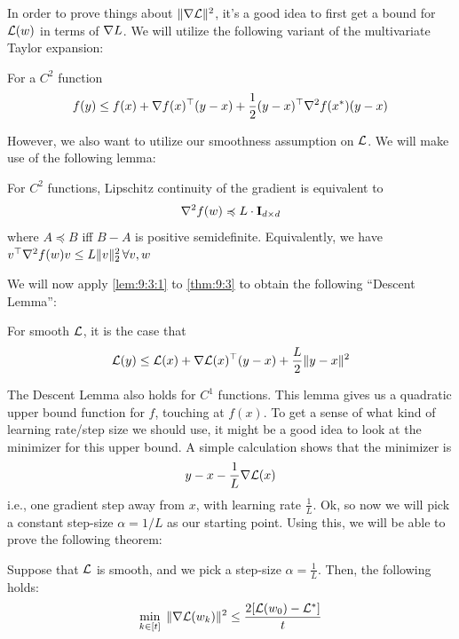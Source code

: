 In order to prove things about $\lVert \nabla \mathcal{L} \rVert^2$, it's a good idea to first get a bound for $\mathcal{L}(w)$ in terms of $\nabla L$. We will utilize the following variant of the multivariate Taylor expansion:
\begin{theorem}
\label{thm:9:3}
For a $C^2$ function
\begin{align*}
    f(y) \leq f(x) + \nabla f(x)^\top (y - x) + \frac{1}{2} (y-x)^\top \nabla^2f(x^*)(y - x)
\end{align*}
\end{theorem}
However, we also want to utilize our smoothness assumption on $\mathcal{L}$. We will make use of the following lemma:
\begin{lemma}
\label{lem:9:3:1}
For $C^2$ functions, Lipschitz continuity of the gradient is equivalent to
\begin{align*}
    \nabla^2 f(w) \preccurlyeq L \cdot \mathbf{I}_{d\times d}
\end{align*}
    where $A \preccurlyeq B$ iff  $B - A$ is positive semidefinite. Equivalently, we have
    $v^\top \nabla^2 f(w)v \leq L\lVert v \rVert_2^2 \, \forall v,w$
\end{lemma}
We will now apply \autoref{lem:9:3:1} to \autoref{thm:9:3} to obtain the following ``Descent Lemma'':
\begin{lemma}
For smooth $\mathcal{L}$, it is the case that
\begin{align*}
    \mathcal{L}(y) \leq \mathcal{L}(x) + \nabla\mathcal{L}(x)^\top(y - x) + \frac{L}{2}\lVert y - x \rVert^2
\end{align*}
\end{lemma}
The Descent Lemma also holds for $C^1$ functions. This lemma gives us a quadratic upper bound function for $f$, touching at $f(x)$. To get a sense of what kind of learning rate/step size we should use, it might be a good idea to look at the minimizer for this upper bound. A simple calculation shows that the minimizer is
\begin{align*}
    y - x - \frac{1}{L} \nabla \mathcal{L}(x)
\end{align*}
i.e., one gradient step away from $x$, with learning rate $\frac{1}{L}$. Ok, so now we will pick a constant step-size $\alpha = 1/L$ as our starting point. Using this, we will be able to prove the following theorem:
\begin{mdframed}
\begin{theorem}
\label{gd:thm:smooth:convg}
Suppose that $\mathcal{L}$ is smooth, and we pick a step-size $\alpha = \frac{1}{L}$. Then, the following holds:
\begin{align*}
    \min_{k \in [t]}{\; \lVert \nabla \mathcal{L}(w_k) \rVert^2} \leq \frac{2[\mathcal{L}(w_0) - \mathcal{L}^*]}{t}
\end{align*}
\end{theorem}
\end{mdframed}

